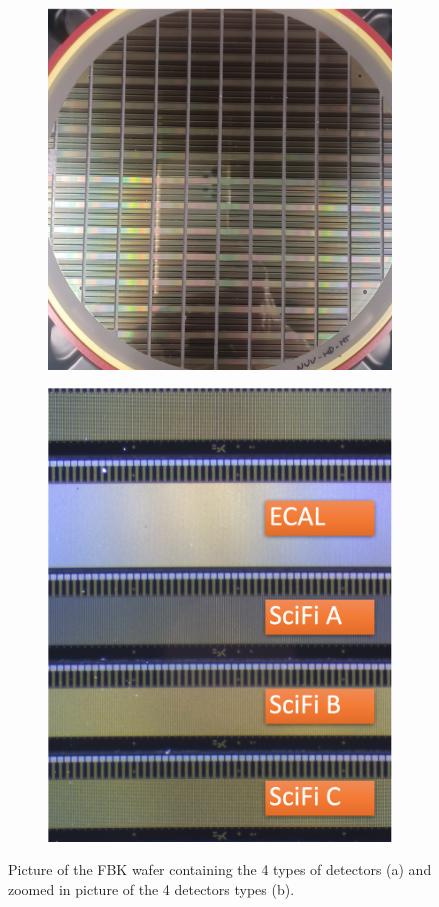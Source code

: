 \begin{figure}[htbp]
  \centering
  \begin{subfigure}[b]{0.48\linewidth}
    \centering
    \includegraphics[width=0.9\linewidth]{gfx/pictures/Wafer.png}      
    \caption{}
  \end{subfigure}
  \hfill
  \begin{subfigure}[b]{0.48\linewidth}
    \centering
    \hspace{0.5cm}
    \includegraphics[width=0.7\linewidth]{gfx/pictures/FBK_types_Wafer.png}
    \caption{}    
  \end{subfigure}
    \caption{Picture of the FBK wafer containing the 4 types of detectors (a) and zoomed in picture of the 4 detectors types (b).}
    \label{fig:picture wafer}
\end{figure}

